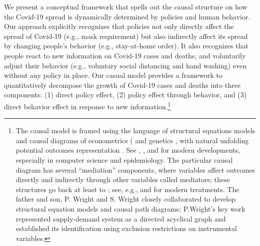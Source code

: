 \documentclass[11pt,reqno,letter]{amsart}
\theoremstyle{definition}
\begin{document}
We present a conceptual framework that spells out the causal structure on how the Covid-19 spread  is dynamically determined by policies and human behavior. Our approach explicitly recognizes that policies not only directly affect the spread of Covid-19 (e.g., mask requirement) but also indirectly affect its spread by changing people's behavior (e.g., stay-at-home order). It also recognizes that people react to new information on Covid-19 cases and deaths, and voluntarily adjust their behavior (e.g., voluntary social distancing and hand washing) even without any policy in place.  Our casual model provides a framework to quantitatively decompose the growth of Covid-19 cases and deaths into three components: (1) direct policy effect, (2) policy effect through behavior, and (3) direct behavior effect in response to new information.\footnote{
The causal model is framed using the language of structural equations models and causal diagrams of econometrics (\cite{pwright, haavelmo1944, heckman2007} and genetics \citep{wright1923}, with natural unfolding potential outcomes representation \citep{rubin1974,tinbergen1930,neyman:PO,imbens_rubin_2015}. See \cite{pearl:robins}, \cite{peters2020book}, and \cite{hernanrobins2020book}  for modern developments, especially in computer
science and epidemiology. The particular causal diagram has several “mediation” components, where variables affect
outcomes directly and indirectly through other variables called mediators; these structures go back at least to \cite[][see Figure 6]{wright1923}; see, e.g., \cite{baron1986} and \cite{Hines2020} for modern treatments. The father and son,
P. Wright and S. Wright closely collaborated to develop structural equation models and causal path diagrams; P.Wright’s
key work represented supply-demand system as a directed acyclical graph and established its identification using
exclusion restrictions on instrumental variables.
}

\end{document}
